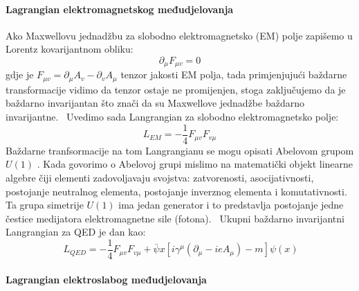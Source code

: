 \documentclass[12pt,a4paper,oneside]{article}
\begin{document}
\begin{linenumbers}
		\paragraph{Lagrangian elektromagnetskog međudjelovanja\newline} 
		Ako Maxwellovu jednadžbu za slobodno elektromagnetsko (EM) polje  zapišemo u Lorentz kovarijantnom obliku:
		\begin{equation}
		\partial_\mu F_{\mu v} = 0
		\end{equation}
		gdje je \begin{math}
		F_{\mu v} = \partial_\mu A_v - \partial_v A_\mu 
		\end{math}
		tenzor jakosti EM polja, tada primjenjujući baždarne transformacije vidimo da tenzor ostaje ne promijenjen, stoga zaključujemo da je baždarno invarijantan što znači da su Maxwellove jednadžbe baždarno invarijantne.~\cite{dokt2} 
		Uvedimo sada Langrangian za slobodno elektromagnetsko polje:
		\begin{equation}
		L_{EM} = - \frac{1}{4} F_{\mu v} F_{v \mu}
		\end{equation}
		Baždarne tranfsormacije na tom Langrangianu se mogu opisati Abelovom grupom \begin{math}
		U(1)
		\end{math} . Kada govorimo o Abelovoj grupi mislimo na  matematički objekt linearne algebre čiji elementi zadovoljavaju svojstva: zatvorenosti, asocijativnosti, postojanje neutralnog elementa, postojanje inverznog elementa i komutativnosti.
		Ta grupa simetrije \begin{math}
		U(1)
		\end{math} ima jedan generator i to predstavlja postojanje jedne čestice medijatora elektromagnetne sile (fotona).~\cite{dokt2}
		Ukupni baždarno invarijantni Langrangian za QED je dan kao: 
		\begin{equation}\
		L_{QED}= -\frac{1}{4} F_{\mu v} F_{v \mu} + \bar{\psi}x [i \gamma^\mu (\partial_\mu - i e A_\mu) -m]\psi(x)
		\end{equation}
		\paragraph{Lagrangian elektroslabog međudjelovanja\newline}
		

\end{linenumbers}
\end{document}
